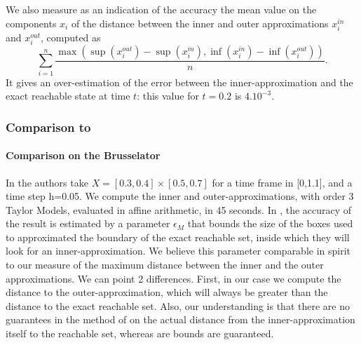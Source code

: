 We also measure as an indication of the accuracy the mean value on the components $x_i$ of the distance between the inner and outer approximations $x_i^{in}$ and $x_i^{out}$,
computed as $$\sum_{i=1}^n \frac{\max(\sup(x_i^{out})-\sup(x_i^{in}),\inf(x_i^{in})- \inf(x_i^{out}))}{n}.$$
It gives an over-estimation of the error between the inner-approximation and the exact reachable state at time $t$: this value for $t=0.2$ is $4.10^{-3}$.




\subsubsection{Comparison to \cite{underapprox16}}
\paragraph{Comparison on the Brusselator}
In \cite{underapprox16} the authors take $X=[0.3, 0.4] \times [0.5, 0.7]$ for a time frame in [0,1.1], and a time step h=0.05. 
We compute the inner and outer-approximations, with order 3 Taylor Models, evaluated in affine arithmetic, in 45 seconds.
In \cite{underapprox16}, the accuracy of the result is estimated by a parameter $\epsilon_M$ that bounds the size of 
the boxes used to approximated the boundary of the exact reachable set, inside which they will look for an inner-approximation. 
We believe this parameter comparable in spirit 
to our measure of the maximum distance between the inner and the outer approximations. We can point 2 differences. First, in our case 
we compute the distance to the outer-approximation, which will always be greater than the distance to the exact reachable set.
Also, our understanding is that there are no guarantees in the method of \cite{underapprox16} on the actual distance from the inner-approximation itself 
to the reachable set, whereas are bounds are guaranteed. 


